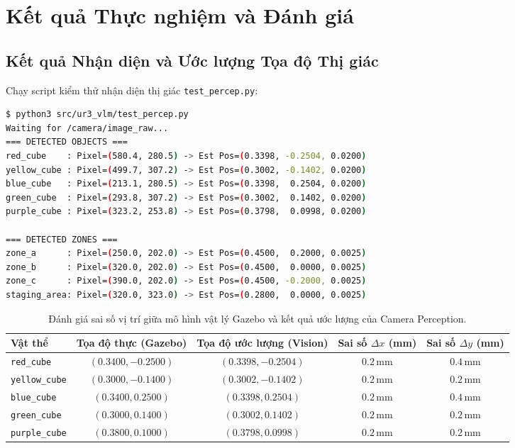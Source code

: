 \documentclass[a4paper,12pt]{article}
\begin{document}
\section{Kết quả Thực nghiệm và Đánh giá}

\subsection{Kết quả Nhận diện và Ước lượng Tọa độ Thị giác}
Chạy script kiểm thử nhận diện thị giác \texttt{test_percep.py}:
\begin{lstlisting}[language=bash]
$ python3 src/ur3_vlm/test_percep.py
Waiting for /camera/image_raw...
=== DETECTED OBJECTS ===
red_cube    : Pixel=(580.4, 280.5) -> Est Pos=(0.3398, -0.2504, 0.0200)
yellow_cube : Pixel=(499.7, 307.2) -> Est Pos=(0.3002, -0.1402, 0.0200)
blue_cube   : Pixel=(213.1, 280.5) -> Est Pos=(0.3398,  0.2504, 0.0200)
green_cube  : Pixel=(293.8, 307.2) -> Est Pos=(0.3002,  0.1402, 0.0200)
purple_cube : Pixel=(323.2, 253.8) -> Est Pos=(0.3798,  0.0998, 0.0200)

=== DETECTED ZONES ===
zone_a      : Pixel=(250.0, 202.0) -> Est Pos=(0.4500,  0.2000, 0.0025)
zone_b      : Pixel=(320.0, 202.0) -> Est Pos=(0.4500,  0.0000, 0.0025)
zone_c      : Pixel=(390.0, 202.0) -> Est Pos=(0.4500, -0.2000, 0.0025)
staging_area: Pixel=(320.0, 323.0) -> Est Pos=(0.2800,  0.0000, 0.0025)
\end{lstlisting}

\begin{table}[H]\centering
\small
\begin{tabular}{lcccc}
\toprule
Vật thể & Tọa độ thực (Gazebo) & Tọa độ ước lượng (Vision) & Sai số $\Delta x$ (mm) & Sai số $\Delta y$ (mm)\\
\midrule
\texttt{red\_cube} & $(0.3400, -0.2500)$ & $(0.3398, -0.2504)$ & $0.2\,\text{mm}$ & $0.4\,\text{mm}$\\
\texttt{yellow\_cube} & $(0.3000, -0.1400)$ & $(0.3002, -0.1402)$ & $0.2\,\text{mm}$ & $0.2\,\text{mm}$\\
\texttt{blue\_cube} & $(0.3400,  0.2500)$ & $(0.3398,  0.2504)$ & $0.2\,\text{mm}$ & $0.4\,\text{mm}$\\
\texttt{green\_cube} & $(0.3000,  0.1400)$ & $(0.3002,  0.1402)$ & $0.2\,\text{mm}$ & $0.2\,\text{mm}$\\
\texttt{purple\_cube} & $(0.3800,  0.1000)$ & $(0.3798,  0.0998)$ & $0.2\,\text{mm}$ & $0.2\,\text{mm}$\\
\bottomrule
\end{tabular}
\caption{Đánh giá sai số vị trí giữa mô hình vật lý Gazebo và kết quả ước lượng của Camera Perception.}
\label{tab:percep_eval}
\end{table}
\end{document}
